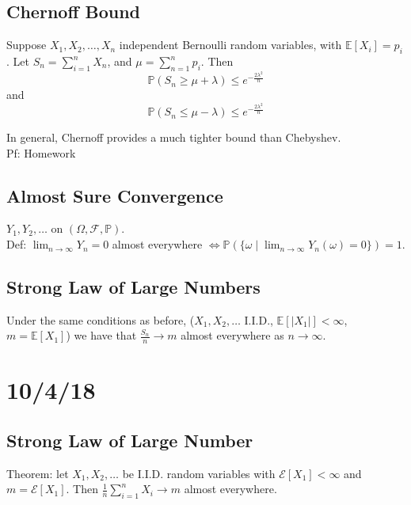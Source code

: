 \documentclass[english, 11pt]{article}
\begin{document}
\subsection{Chernoff Bound}

Suppose $X_1, X_2, \dots, X_n$ independent Bernoulli random variables, with $\mathbb{E}[X_i] = p_i$. Let $S_n = \sum_{i = 1}^n X_n$, and $\mu = \sum_{n = 1}^n p_i$. Then
\[\mathbb{P}(S_n \geq \mu + \lambda) \leq e^{-\frac{2\lambda^2}{n}}\]
and\[
\mathbb{P}(S_n \leq \mu - \lambda) \leq e^{-\frac{2\lambda^2}{n}}\]

In general, Chernoff provides a much tighter bound than Chebyshev.\\

Pf: Homework\\

\subsection{Almost Sure Convergence}
$Y_1, Y_2, \dots$ on $(\Omega, \mathcal{F}, \mathbb{P})$.\\

Def: $\lim_{n \to \infty} Y_n = 0$ almost everywhere $\iff \mathbb{P}(\{\omega \mid \lim_{n \to \infty} Y_n(\omega) = 0 \}) = 1$.\\

\subsection{Strong Law of Large Numbers}

Under the same conditions as before, ($X_1, X_2, \dots$ I.I.D., $\mathbb{E}[|X_1|] < \infty$, $m = \mathbb{E}[X_1]$) we have that $\frac{S_n}{n} \to m$ almost everywhere as $n \to \infty$.\\

\section{10/4/18}

\subsection{Strong Law of Large Number}

Theorem: let $X_1, X_2, \dots$ be I.I.D. random variables with $\mathcal{E}[X_1] < \infty$ and $m = \mathcal{E}[X_1]$. Then $\frac{1}{n}\sum_{i=1}^n X_i \to m$ almost everywhere.\\
\end{document}
